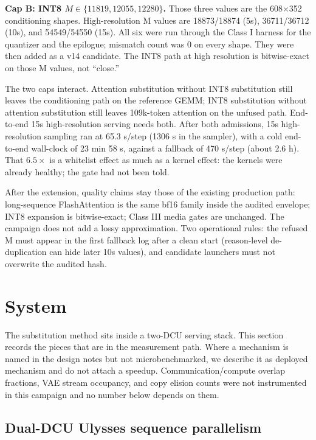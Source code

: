 \documentclass[11pt]{article}
\begin{document}
\textbf{Cap B: INT8 $M \in \{11819, 12055, 12280\}$.} Those three values are the 608$\times$352 conditioning shapes. High-resolution M values are 18873/18874 (5s), 36711/36712 (10s), and 54549/54550 (15s). All six were run through the Class I harness for the quantizer and the epilogue; mismatch count was 0 on every shape. They were then added as a v14 candidate. The INT8 path at high resolution is bitwise-exact on those M values, not ``close.''

The two caps interact. Attention substitution without INT8 substitution still leaves the conditioning path on the reference GEMM; INT8 substitution without attention substitution still leaves 109k-token attention on the unfused path. End-to-end 15s high-resolution serving needs both. After both admissions, 15s high-resolution sampling ran at 65.3 s/step (1306 s in the sampler), with a cold end-to-end wall-clock of 23 min 58 s, against a fallback of 470 s/step (about 2.6 h). That $6.5\times$ is a whitelist effect as much as a kernel effect: the kernels were already healthy; the gate had not been told.

After the extension, quality claims stay those of the existing production path: long-sequence FlashAttention is the same bf16 family inside the audited envelope; INT8 expansion is bitwise-exact; Class III media gates are unchanged. The campaign does not add a lossy approximation. Two operational rules: the refused M must appear in the first fallback log after a clean start (reason-level de-duplication can hide later 10s values), and candidate launchers must not overwrite the audited hash.

\section{System}
\label{sec:system}

The substitution method sits inside a two-DCU serving stack. This section records the pieces that are in the measurement path. Where a mechanism is named in the design notes but not microbenchmarked, we describe it as deployed mechanism and do not attach a speedup. Communication/compute overlap fractions, VAE stream occupancy, and copy elision counts were not instrumented in this campaign and no number below depends on them.

\subsection{Dual-DCU Ulysses sequence parallelism}
\label{sec:ulysses}
\end{document}
